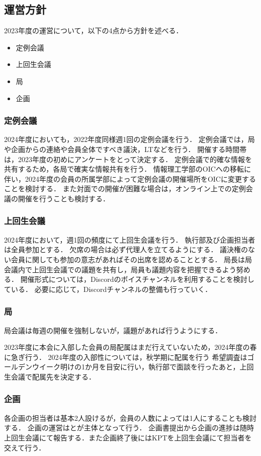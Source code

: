 \subsection*{運営方針}


2023年度の運営について，以下の4点から方針を述べる．
\begin{itemize}
    \item 定例会議
    \item 上回生会議
    \item 局
    \item 企画
\end{itemize}

\subsubsection*{定例会議}
2024年度においても，2022年度同様週1回の定例会議を行う．
定例会議では，局や企画からの連絡や会員全体ですべき議決，LTなどを行う．
開催する時間帯は，2023年度の初めにアンケートをとって決定する．
定例会議で的確な情報を共有するため，各局で確実な情報共有を行う．
情報理工学部のOICへの移転に伴い，2024年度の会員の所属学部によって定例会議の開催場所をOICに変更することを検討する．
また対面での開催が困難な場合は，オンライン上での定例会議の開催を行うことも検討する．

\subsubsection*{上回生会議}
2024年度において，週1回の頻度にて上回生会議を行う．
執行部及び企画担当者は全員参加とする．
欠席の場合は必ず代理人を立てるようにする．
議決権のない会員に関しても参加の意志があればその出席を認めることとする．
局長は局会議内で上回生会議での議題を共有し，局員も議題内容を把握できるよう努める．
開催形式については，Discordのボイスチャンネルを利用することを検討している．
必要に応じて，Discordチャンネルの整備も行っていく．

\subsubsection*{局}
局会議は毎週の開催を強制しないが，議題があれば行うようにする．

2023年度に本会に入部した会員の局配属はまだ行えていないため，2024年度の春に急ぎ行う．
2024年度の入部性については，秋学期に配属を行う
希望調査はゴールデンウイーク明けの1か月を目安に行い，執行部で面談を行ったあと，上回生会議で配属先を決定する．

\subsubsection*{企画}
各企画の担当者は基本2人設けるが，会員の人数によっては1人にすることも検討する．
企画の運営は\newGradeIfKouki{}\secondGrade{}と\newGradeIfKouki{}\thirdGrade{}が主体となって行う．
企画書提出から企画の進捗は随時上回生会議にて報告する．また企画終了後にはKPTを上回生会議にて担当者を交えて行う．
